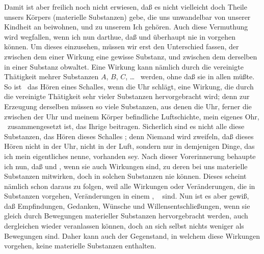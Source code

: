 \begin{aufza}
\item Damit ist aber freilich noch nicht erwiesen, daß es nicht vielleicht doch  Theile unsers Körpers (materielle Substanzen) gebe, die uns unwandelbar von unserer Kindheit an beiwohnen, und zu unserem Ich gehören. Auch diese Vermuthung wird wegfallen, wenn ich nun darthue, daß  und  überhaupt nie in  vorgehen können. Um dieses einzusehen, müssen wir erst den Unterschied fassen, der zwischen dem  einer Wirkung  eine gewisse Substanz, und zwischen dem  derselben in einer Substanz obwaltet. Eine Wirkung kann nämlich durch die vereinigte Thätigkeit mehrer Substanzen $A$, $B$, $C$, \ldots\  werden, ohne daß sie in allen  müßte. So ist \zB\ das Hören eines Schalles, wenn die Uhr schlägt, eine Wirkung, die durch die vereinigte Thätigkeit sehr vieler Substanzen hervorgebracht wird; denn zur Erzeugung derselben müssen so viele Substanzen, aus denen die Uhr, ferner die zwischen der Uhr und meinem Körper befindliche Luftschichte, mein eigenes Ohr, \usw\ zusammengesetzt ist, das Ihrige beitragen. Sicherlich sind es nicht alle diese Substanzen,  das Hören dieses Schalles ; denn Niemand wird zweifeln, daß dieses Hören nicht in der Uhr, nicht in der Luft, sondern nur in demjenigen Dinge, das ich mein eigentliches  nenne, vorhanden sey. Nach dieser Vorerinnerung behaupte ich nun, daß  und , wenn sie auch Wirkungen sind, zu deren  bei uns materielle Substanzen mitwirken, doch in solchen Substanzen nie  können. Dieses scheint nämlich schon daraus zu folgen, weil alle Wirkungen oder Veränderungen, die in  Substanzen vorgehen, Veränderungen in einem , \dh\  sind.
Nun ist es aber gewiß, daß Empfindungen, Gedanken, Wünsche und Willensentschließungen, wenn sie gleich durch Bewegungen materieller Substanzen hervorgebracht werden, auch dergleichen wieder veranlassen können, doch an sich selbst nichts weniger als Bewegungen sind. Daher kann auch der Gegenstand, in welchem diese Wirkungen vorgehen, keine materielle Substanzen enthalten.

\end{aufza}
